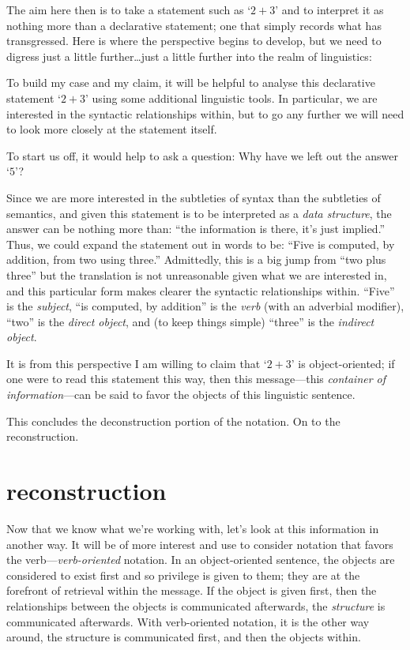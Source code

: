 \documentclass[twoside]{book}
\begin{document}
The aim here then is to take a statement such as `$ 2+3 $' and to interpret it as nothing more than a declarative
statement; one that simply records what has transgressed.  Here is where the perspective begins to develop,
but we need to digress just a little further\ldots just a little further into the realm of linguistics:

To build my case and my claim, it will be helpful to analyse this declarative statement `$ 2+3 $' using some
additional linguistic tools.  In particular, we are interested in the syntactic relationships within, but
to go any further we will need to look more closely at the statement itself.  

To start us off, it would help to ask a question:  Why have we left out the answer `$ 5 $'?

Since we are more interested in the subtleties of syntax than the subtleties of semantics, and given this
statement is to be interpreted as a \emph{data structure}, the answer can be nothing more than:
``the information is there, it's just implied.''  Thus, we could expand the statement out in words to be:
``Five is computed, by addition, from two using three.''  Admittedly, this is a big jump from ``two plus
three'' but the translation is not unreasonable given what we are interested in, and this particular form
makes clearer the syntactic relationships within.  ``Five'' is the \emph{subject}, ``is computed, by addition''
is the \emph{verb} (with an adverbial modifier), ``two'' is the \emph{direct object}, and (to keep things simple)
``three'' is the \emph{indirect object}.

It is from this perspective I am willing to claim that `$ 2+3 $' is object-oriented; if one were to read this
statement this way, then this message---this \emph{container of information}---can be said to favor the objects
of this linguistic sentence.

This concludes the deconstruction portion of the notation.  On to the reconstruction.

\section{reconstruction}

Now that we know what we're working with, let's look at this information in another way.  It will be of more
interest and use to consider notation that favors the verb---\emph{verb-oriented} notation.  In an
object-oriented sentence, the objects are considered to exist first and so privilege is given to them; they
are at the forefront of retrieval within the message.  If the object is given first, then the relationships
between the objects is communicated afterwards, the \emph{structure} is communicated afterwards.  With
verb-oriented notation, it is the other way around, the structure is communicated first, and then the
objects within.
\end{document}
